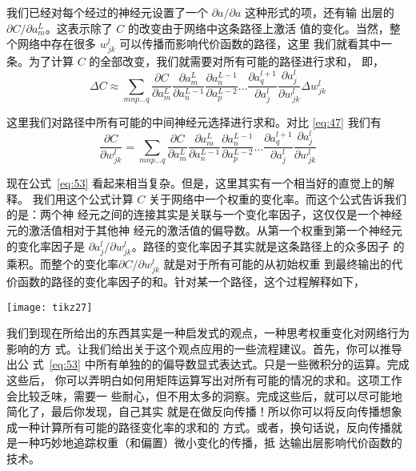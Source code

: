 我们已经对每个经过的神经元设置了一个 $\partial a/\partial a$ 这种形式的项，还有输
出层的 $\partial C/\partial a_m^L$。这表示除了 $C$ 的改变由于网络中这条路径上激活
值的变化。当然，整个网络中存在很多 $w_{jk}^l$ 可以传播而影响代价函数的路径，这里
我们就看其中一条。为了计算 $C$ 的全部改变，我们就需要对所有可能的路径进行求和，
即，
\begin{equation}
  \Delta C \approx \sum_{mnp\ldots q} \frac{\partial C}{\partial a^L_m}
  \frac{\partial a^L_m}{\partial a^{L-1}_n} \frac{\partial a^{L-1}_n}{\partial
    a^{L-2}_p} \ldots \frac{\partial a^{l+1}_q}{\partial a^l_j} \frac{\partial
    a^l_j}{\partial w^l_{jk}} \Delta w^l_{jk}
  \label{eq:52}\tag{52}
\end{equation}

这里我们对路径中所有可能的中间神经元选择进行求和。对比 \eqref{eq:47} 我们有
\begin{equation}
  \frac{\partial C}{\partial w^l_{jk}} = \sum_{mnp\ldots q} \frac{\partial
    C}{\partial a^L_m} \frac{\partial a^L_m}{\partial a^{L-1}_n} \frac{\partial
    a^{L-1}_n}{\partial a^{L-2}_p} \ldots \frac{\partial a^{l+1}_q}{\partial
    a^l_j} \frac{\partial a^l_j}{\partial w^l_{jk}}
\label{eq:53}\tag{53}
\end{equation}

现在公式~\eqref{eq:53} 看起来相当复杂。但是，这里其实有一个相当好的直觉上的解释。
我们用这个公式计算 $C$ 关于网络中一个权重的变化率。而这个公式告诉我们的是：两个神
经元之间的连接其实是关联与一个变化率因子，这仅仅是一个神经元的激活值相对于其他神
经元的激活值的偏导数。从第一个权重到第一个神经元的变化率因子是
$\partial a_j^l/\partial w_{jk}^l$。路径的变化率因子其实就是这条路径上的众多因子
的乘积。而整个的变化率$\partial C/\partial w_{jk}^l$ 就是对于所有可能的从初始权重
到最终输出的代价函数的路径的变化率因子的和。针对某一个路径，这个过程解释如下，

\begin{center}
  \texttt{[image: tikz27]}
\end{center}

我们到现在所给出的东西其实是一种启发式的观点，一种思考权重变化对网络行为影响的方
式。让我们给出关于这个观点应用的一些流程建议。首先，你可以推导出公
式~\eqref{eq:53} 中所有单独的的偏导数显式表达式。只是一些微积分的运算。完成这些后，
你可以弄明白如何用矩阵运算写出对所有可能的情况的求和。这项工作会比较乏味，需要一
些耐心，但不用太多的洞察。完成这些后，就可以尽可能地简化了，最后你发现，自己其实
就是在做反向传播！所以你可以将反向传播想象成一种计算所有可能的路径变化率的求和的
方式。或者，换句话说，反向传播就是一种巧妙地追踪权重（和偏置）微小变化的传播，抵
达输出层影响代价函数的技术。

